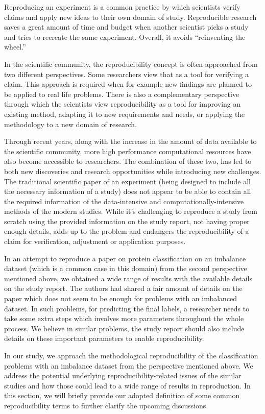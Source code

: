 Reproducing an experiment is a common practice by which scientists verify claims and apply new ideas to their 
own domain of study. Reproducible research saves a great amount of time and budget when another scientist picks 
a study and tries to recreate the same experiment. Overall, it avoids “reinventing the wheel.”

In the scientific community, the reproducibility concept is often approached from two different perspectives. 
Some researchers view that as a tool for verifying a claim. This approach is required when for example new 
findings are planned to be applied to real life problems. There is also a complementary perspective through 
which the scientists view reproducibility as a tool for improving an existing method, adapting it to new 
requirements and needs, or applying the methodology to a new domain of research.

Through recent years, along with the increase in the amount of data available to the scientific community, 
more high performance computational resources have also become accessible to researchers. The combination 
of these two, has led to both new discoveries and research opportunities while introducing new challenges. 
The traditional scientific paper of an experiment (being designed to include all the necessary information 
of a study) does not appear to be able to contain all the required information of the data-intensive and 
computationally-intensive methods of the modern studies. While it’s challenging to reproduce a study from 
scratch using the provided information on the study report, not having proper enough details, adds up to 
the problem and endangers the reproducibility of a claim for verification, adjustment or application purposes.

In an attempt to reproduce a paper on protein classification on an imbalance dataset (which is a common case 
in this domain) from the second perspective mentioned above, we obtained a wide range of results with the 
available details on the study report. The authors had shared a fair amount of details on the paper which 
does not seem to be enough for problems with an imbalanced dataset. In such problems, for predicting the final 
labels, a researcher needs to take some extra steps which involves more parameters throughout the whole process. 
We believe in similar problems, the study report should also include details on these important parameters to 
enable reproducibility.

In our study, we approach the methodological reproducibility of the classification problems with an imbalance 
dataset from the perspective mentioned above. We address the potential underlying reproducibility-related issues 
of the similar studies and how those could lead to a wide range of results in reproduction. In this section, we 
will briefly provide our adopted definition of some common reproducibility terms to further clarify the 
upcoming discussions.

